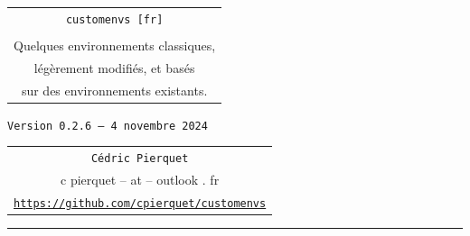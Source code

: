 \documentclass[french,11pt,a4paper]{article}
\def\TPversion{0.2.6}
\def\TPdate{4 novembre 2024}
\begin{document}
\pagestyle{fancy}

\thispagestyle{empty}

\begin{center}
	\begin{minipage}{0.75\linewidth}
	\begin{tcolorbox}[colframe=yellow,colback=yellow!15]
		\begin{center}
			\renewcommand\arraystretch{1.25}
			\begin{tabular}{c}
				{\Huge \texttt{customenvs [fr]}}\\
				\\
				{\Large Quelques environnements classiques,} \\
				{\Large légèrement modifiés, et basés} \\
				{\Large sur des environnements existants.} \\
			\end{tabular}
			\renewcommand\arraystretch{1}
			
			\medskip
			
			{\small \texttt{Version \TPversion{} -- \TPdate}}
		\end{center}
	\end{tcolorbox}
\end{minipage}
\end{center}

\vspace*{1mm}

\begin{center}
	\begin{tabular}{c}
	\texttt{Cédric Pierquet}\\
	{\ttfamily c pierquet -- at -- outlook . fr}\\
	\texttt{\url{https://github.com/cpierquet/customenvs}}
\end{tabular}
\end{center}

\vspace*{5mm}

%
%
%
%
%

\hrule


\hypertarget{matoc}{}
\end{document}
